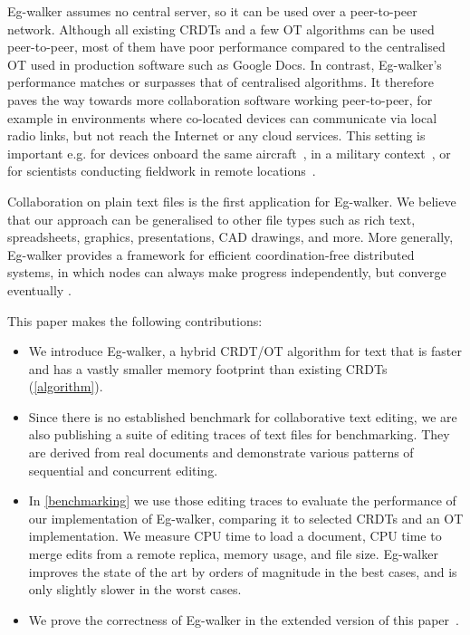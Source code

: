 \documentclass[sigplan,10pt]{acmart}
\newif\ifincludeappendix
\newcommand{\algname}{Eg-walker\xspace}
\begin{document}
\algname assumes no central server, so it can be used over a peer-to-peer network.
Although all existing CRDTs and a few OT algorithms can be used peer-to-peer, most of them have poor performance compared to the centralised OT used in production software such as Google Docs.
In contrast, \algname's performance matches or surpasses that of centralised algorithms.
It therefore paves the way towards more collaboration software working peer-to-peer, for example in environments where co-located devices can communicate via local radio links, but not reach the Internet or any cloud services.
This setting is important e.g. for devices onboard the same aircraft~\cite{ditto-aircraft}, in a military context~\cite{ditto-military}, or for scientists conducting fieldwork in remote locations~\cite{antarctica}.

Collaboration on plain text files is the first application for \algname.
We believe that our approach can be generalised to other file types such as rich text, spreadsheets, graphics, presentations, CAD drawings, and more.
More generally, \algname provides a framework for efficient coordination-free distributed systems, in which nodes can always make progress independently, but converge eventually \cite{Hellerstein2010}.

This paper makes the following contributions:

\begin{itemize}
\item We introduce \algname, a hybrid CRDT/OT algorithm for text that is faster and has a vastly smaller memory footprint than existing CRDTs (\autoref{algorithm}).
\item Since there is no established benchmark for collaborative text editing, we are also publishing a suite of editing traces of text files for benchmarking. They are derived from real documents and demonstrate various patterns of sequential and concurrent editing.
\item In \autoref{benchmarking} we use those editing traces to evaluate the performance of our implementation of \algname, comparing it to selected CRDTs and an OT implementation. We measure CPU time to load a document, CPU time to merge edits from a remote replica, memory usage, and file size. \algname improves the state of the art by orders of magnitude in the best cases, and is only slightly slower in the worst cases.
\item We prove the correctness of \algname in \ifincludeappendix\autoref{proofs}.\else the extended version of this paper~\cite{extended-version}.\fi
\end{itemize}
\end{document}

